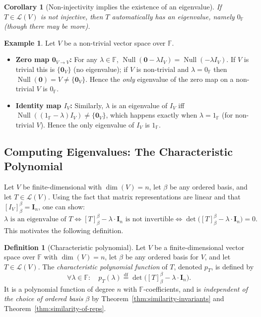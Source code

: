 \documentclass[11pt, a4paper, notitlepage]{report}
\newtheorem{corollary}[theorem]{Corollary}
\theoremstyle{definition}
\newtheorem{definition}[theorem]{Definition}
\newtheorem{example}[theorem]{Example}
\theoremstyle{remark}
\begin{document}
\begin{corollary}[Non-injectivity implies the existence of an eigenvalue]\label{cor:non-inj-eigenvalue}
If $T \in \mathcal{L}(V)$ is not injective, then $T$ automatically has an eigenvalue,
namely $0_{\mathbb{F}}$ (though there may be more).
\end{corollary}

\begin{example}\label{ex:eigenvalue-zero-identity}
Let $V$ be a non-trivial vector space over $\mathbb{F}$.
\begin{itemize}
  \item \textbf{Zero map $\mathbf{0}_{V \to V}$:} For any $\lambda \in \mathbb{F}$,
    $\operatorname{Null}(\mathbf{0} - \lambda I_V) = \operatorname{Null}(-\lambda I_V)$.
    If $V$ is trivial this is $\{\mathbf{0}_V\}$ (no eigenvalue); if $V$ is non-trivial
    and $\lambda = 0_{\mathbb{F}}$ then $\operatorname{Null}(\mathbf{0}) = V \neq \{\mathbf{0}_V\}$.
    Hence the \emph{only} eigenvalue of the zero map on a non-trivial $V$ is $0_{\mathbb{F}}$.
  \item \textbf{Identity map $I_V$:} Similarly, $\lambda$ is an eigenvalue of $I_V$ iff
    $\operatorname{Null}((1_{\mathbb{F}} - \lambda)I_V) \neq \{\mathbf{0}_V\}$, which happens
    exactly when $\lambda = 1_{\mathbb{F}}$ (for non-trivial $V$). Hence the only eigenvalue
    of $I_V$ is $1_{\mathbb{F}}$.
\end{itemize}
\end{example}

\subsection{Computing Eigenvalues: The Characteristic Polynomial}

Let $V$ be finite-dimensional with $\dim(V) = n$, let $\beta$ be any ordered basis, and
let $T \in \mathcal{L}(V)$. Using the fact that matrix representations are linear and that
$[I_V]_\beta^\beta = \mathbf{I}_n$, one can show:
\[
  \lambda \text{ is an eigenvalue of } T
  \iff [T]_\beta^\beta - \lambda \cdot \mathbf{I}_n \text{ is not invertible}
  \iff \det\!\bigl([T]_\beta^\beta - \lambda \cdot \mathbf{I}_n\bigr) = 0.
\]
This motivates the following definition.

\begin{definition}[Characteristic polynomial]\label{def:char-poly}
Let $V$ be a finite-dimensional vector space over $\mathbb{F}$ with $\dim(V) = n$, let
$\beta$ be any ordered basis for $V$, and let $T \in \mathcal{L}(V)$. The
\emph{characteristic polynomial function} of $T$, denoted $p_T$, is defined by
\[
  \forall \lambda \in \mathbb{F} : \quad
  p_T(\lambda) \stackrel{\mathrm{df}}{=} \det\!\bigl([T]_\beta^\beta - \lambda \cdot \mathbf{I}_n\bigr).
\]
It is a polynomial function of degree $n$ with $\mathbb{F}$-coefficients, and is
\emph{independent of the choice of ordered basis} $\beta$ by Theorem~\ref{thm:similarity-invariants}
and Theorem~\ref{thm:similarity-of-reps}.
\end{definition}
\end{document}
